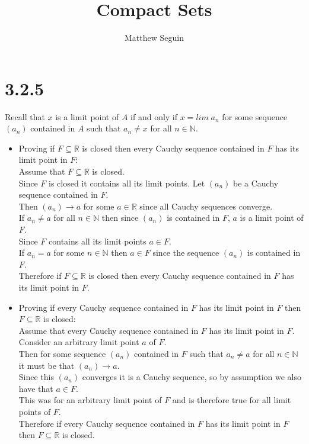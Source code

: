 \documentclass{article}
\title{Compact Sets}
\author{Matthew Seguin}
\date{}
\begin{document}
\maketitle


\section*{3.2.5}
\doublespacing
\begin{center}
    Recall that $x$ is a limit point of $A$ if and only if $x = lim\; a_n$ for some sequence $(a_n)$ contained in $A$ such that $a_n\neq x$ for all $n\in\mathbb{N}$.
\end{center}
\begin{itemize}
    \item Proving if $F\subseteq\mathbb{R}$ is closed then every Cauchy sequence contained in $F$ has its limit point in $F$:
    \\Assume that $F\subseteq\mathbb{R}$ is closed.
    \\Since $F$ is closed it contains all its limit points. Let $(a_n)$ be a Cauchy sequence contained in $F$.
    \\Then $(a_n)\rightarrow a$ for some $a\in\mathbb{R}$ since all Cauchy sequences converge. 
    \\If $a_n\neq a$ for all $n\in\mathbb{N}$ then since $(a_n)$ is contained in $F$, $a$ is a limit point of $F$.
    \\Since $F$ contains all its limit points $a\in F$.
    \\If $a_n = a$ for some $n\in\mathbb{N}$ then $a\in F$ since the sequence $(a_n)$ is contained in $F$.
    \\Therefore if $F\subseteq\mathbb{R}$ is closed then every Cauchy sequence contained in $F$ has its limit point in $F$.
    \item Proving if every Cauchy sequence contained in $F$ has its limit point in $F$ then $F\subseteq\mathbb{R}$ is closed:
    \\Assume that every Cauchy sequence contained in $F$ has its limit point in $F$.
    \\Consider an arbitrary limit point $a$ of $F$.
    \\Then for some sequence $(a_n)$ contained in $F$ such that $a_n\neq a$ for all $n\in\mathbb{N}$ it must be that $(a_n)\rightarrow a$.
    \\Since this $(a_n)$ converges it is a Cauchy sequence, so by assumption we also have that $a\in F$.
    \\This was for an arbitrary limit point of $F$ and is therefore true for all limit points of $F$.
    \\Therefore if every Cauchy sequence contained in $F$ has its limit point in $F$ then $F\subseteq\mathbb{R}$ is closed.
\end{itemize}
\end{document}
